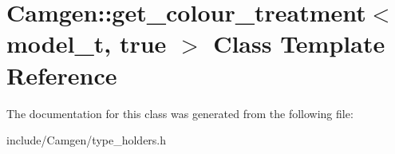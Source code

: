 \hypertarget{a00242}{\section{Camgen\-:\-:get\-\_\-colour\-\_\-treatment$<$ model\-\_\-t, true $>$ Class Template Reference}
\label{a00242}
}


The documentation for this class was generated from the following file\-:\begin{DoxyCompactItemize}
\item 
include/\-Camgen/type\-\_\-holders.\-h\end{DoxyCompactItemize}
